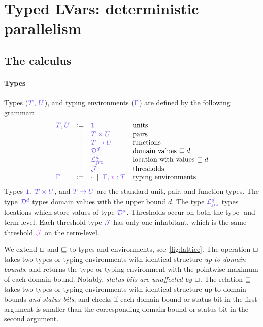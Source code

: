 \documentclass[main.tex]{subfiles}
\begin{document}
\section{Typed LVars: deterministic parallelism}

\subsection{The \typedlambdalvar calculus}


\paragraph*{Types}
Types ($\ty{T}$, $\ty{U}$),  and typing environments ($\ty{\Gamma}$) are defined by the following grammar:
\[
\begin{array}{lrll}
  \ty{T}, \ty{U}
  & \coloneqq & \ty{\tyunit}        & \text{units} \\
  & \sep      & \ty{\typrod{T}{U}}  & \text{pairs} \\
  & \sep      & \ty{\tyfun{T}{U}}   & \text{functions}\\
  & \sep      & \ty{\tyD{d}}        & \text{domain values }{\sqsubseteq d}\\
  & \sep      & \ty{\tyL{\frz}{d}}  & \text{location with values }{\sqsubseteq d}\\
  & \sep      & \ty{\tyJ}           & \text{thresholds}
  \\
  \ty{\Gamma}
  & \coloneqq & \ty{\emptyenv}
    \sep        \ty{\ty{\Gamma},\tmty{x}{T}}
                                    & \text{typing environments}
\end{array}
\]
Types $\ty{\tyunit}$, $\ty{\typrod{T}{U}}$, and $\ty{\tyfun{T}{U}}$ are the standard unit, pair, and function types.
The type $\tyD{d}$ types domain values with the upper bound $d$.
The type $\tyL{\frz}{d}$ types locations which store values of type $\tyD{d}$.
Thresholds occur on both the type- and term-level. Each threshold type $\tyJ$ has only one inhabitant, which is the same threshold $\tmJ$ on the term-level.

We extend $\mathbin{{\color{black}\sqcup}}$ and $\mathbin{{\color{black}\sqsubseteq}}$ to types and environments, see~\cref{fig:lattice}.
The operation $\mathbin{{\color{black}\sqcup}}$ takes two types or typing environments with identical structure \emph{up to domain bounds}, and returns the type or typing environment with the pointwise maximum of each domain bound. Notably, \emph{status bits are unaffected by $\mathbin{{\color{black}\sqcup}}$}.
The relation $\mathbin{{\color{black}\sqsubseteq}}$ takes two types or typing environments with identical structure up to domain bounds \emph{and status bits}, and checks if each domain bound or status bit in the first argument is smaller than the corresponding domain bound or status bit in the second argument.
\end{document}
